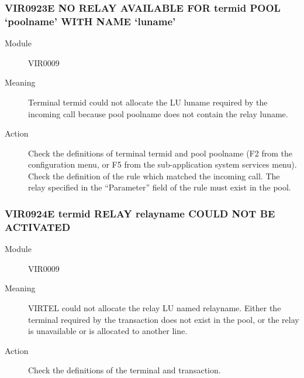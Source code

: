 \documentclass[letterpaper,10pt,english]{sphinxmanual}
\begin{document}
\subsubsection{VIR0923E NO RELAY AVAILABLE FOR termid POOL ‘poolname’ WITH NAME ‘luname’}
\label{\detokenize{messages:vir0923e-no-relay-available-for-termid-pool-poolname-with-name-luname}}\begin{description}
\item[{Module}] \leavevmode
VIR0009

\item[{Meaning}] \leavevmode
Terminal termid could not allocate the LU luname required by the incoming call because pool poolname does not contain the relay luname.

\item[{Action}] \leavevmode
Check the definitions of terminal termid and pool poolname (F2 from the configuration menu, or F5 from the sub-application system services menu). Check the definition of the rule which matched the incoming call. The relay specified in the “Parameter” field of the rule must exist in the pool.

\end{description}


\subsubsection{VIR0924E termid RELAY relayname COULD NOT BE ACTIVATED}
\label{\detokenize{messages:vir0924e-termid-relay-relayname-could-not-be-activated}}\begin{description}
\item[{Module}] \leavevmode
VIR0009

\item[{Meaning}] \leavevmode
VIRTEL could not allocate the relay LU named relayname. Either the terminal required by the transaction does not exist in the pool, or the relay is unavailable or is allocated to another line.

\item[{Action}] \leavevmode
Check the definitions of the terminal and transaction.

\end{description}
\end{document}
